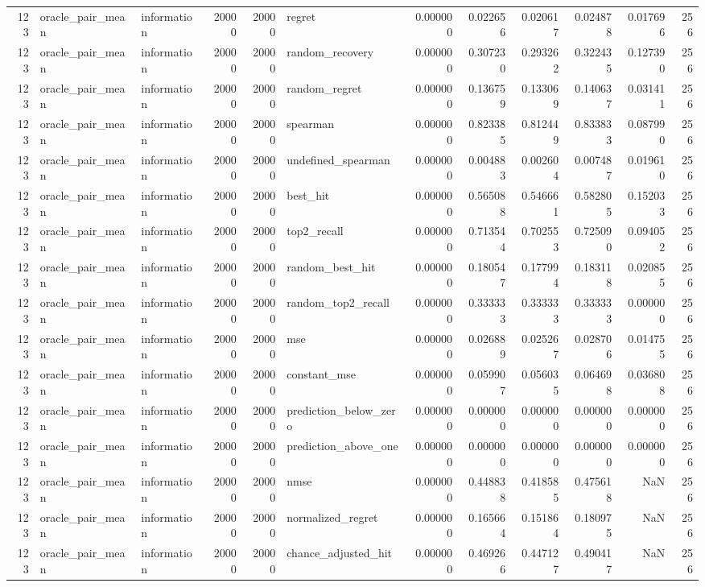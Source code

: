 \begin{tabular}{rllrrlrrrrrr}
123 & oracle_pair_mean & information & 20000 & 20000 & regret & 0.000000 & 0.022656 & 0.020617 & 0.024878 & 0.017696 & 256 \\
123 & oracle_pair_mean & information & 20000 & 20000 & random_recovery & 0.000000 & 0.307230 & 0.293262 & 0.322435 & 0.127390 & 256 \\
123 & oracle_pair_mean & information & 20000 & 20000 & random_regret & 0.000000 & 0.136759 & 0.133069 & 0.140637 & 0.031411 & 256 \\
123 & oracle_pair_mean & information & 20000 & 20000 & spearman & 0.000000 & 0.823385 & 0.812449 & 0.833833 & 0.087990 & 256 \\
123 & oracle_pair_mean & information & 20000 & 20000 & undefined_spearman & 0.000000 & 0.004883 & 0.002604 & 0.007487 & 0.019610 & 256 \\
123 & oracle_pair_mean & information & 20000 & 20000 & best_hit & 0.000000 & 0.565088 & 0.546661 & 0.582805 & 0.152033 & 256 \\
123 & oracle_pair_mean & information & 20000 & 20000 & top2_recall & 0.000000 & 0.713544 & 0.702553 & 0.725090 & 0.094052 & 256 \\
123 & oracle_pair_mean & information & 20000 & 20000 & random_best_hit & 0.000000 & 0.180547 & 0.177994 & 0.183118 & 0.020855 & 256 \\
123 & oracle_pair_mean & information & 20000 & 20000 & random_top2_recall & 0.000000 & 0.333333 & 0.333333 & 0.333333 & 0.000000 & 256 \\
123 & oracle_pair_mean & information & 20000 & 20000 & mse & 0.000000 & 0.026889 & 0.025267 & 0.028706 & 0.014755 & 256 \\
123 & oracle_pair_mean & information & 20000 & 20000 & constant_mse & 0.000000 & 0.059907 & 0.056035 & 0.064698 & 0.036808 & 256 \\
123 & oracle_pair_mean & information & 20000 & 20000 & prediction_below_zero & 0.000000 & 0.000000 & 0.000000 & 0.000000 & 0.000000 & 256 \\
123 & oracle_pair_mean & information & 20000 & 20000 & prediction_above_one & 0.000000 & 0.000000 & 0.000000 & 0.000000 & 0.000000 & 256 \\
123 & oracle_pair_mean & information & 20000 & 20000 & nmse & 0.000000 & 0.448838 & 0.418585 & 0.475618 & NaN & 256 \\
123 & oracle_pair_mean & information & 20000 & 20000 & normalized_regret & 0.000000 & 0.165664 & 0.151864 & 0.180975 & NaN & 256 \\
123 & oracle_pair_mean & information & 20000 & 20000 & chance_adjusted_hit & 0.000000 & 0.469266 & 0.447127 & 0.490417 & NaN & 256 \\

\end{tabular}
